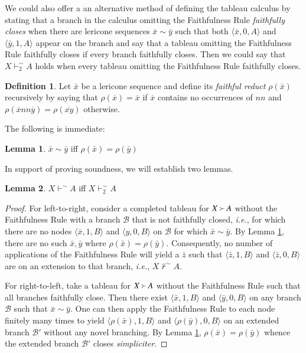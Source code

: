 \documentclass{amsart}
\theoremstyle{definition}
\newtheorem{lemma}{Lemma}
\newtheorem{mdef}{Definition}
\begin{document}
We could also offer a an alternative method of defining the tableau calculus by stating that a branch in the calculus omitting the Faithfulness Rule \emph{faithfully closes} when there are lericone sequences $\bar{x}\sim\bar{y}$ such that both $\langle\bar{x},0,A\rangle$ and $\langle\bar{y},1,A\rangle$ appear on the branch and say that a tableau omitting the Faithfulness Rule faithfully closes if every branch faithfully closes. Then we could say that $X\vdash^{\sim}_{2}A$ holds when every tableau omitting the Faithfulness Rule faithfully closes.

\begin{mdef}
    Let $\bar{x}$ be a lericone sequence and define its \emph{faithful reduct} $\rho(\bar{x})$ recursively by saying that $\rho(\overline{x})=\overline{x}$ if $\overline{x}$ contains no occurrences of $nn$ and $\rho(\overline{x}nn\overline{y})=\rho(\overline{xy})$ otherwise.
\end{mdef}

\noindent The following is immediate:

\begin{lemma}\label{lemma:reduct-identity}
    $\bar{x}\sim\bar{y}$ iff $\rho(\bar{x})=\rho(\bar{y})$
\end{lemma}

\noindent In support of proving soundness, we will establish two lemmas.

\begin{lemma}\label{lemma:equivalence-faithful}
    $X\vdash^{\sim}A$ iff $X\vdash^{\sim}_{2}A$
\end{lemma}

\begin{proof}
    For left-to-right, consider a completed tableau for $X\Yright A$ without the Faithfulness Rule with a branch $\mathcal{B}$ that is not faithfully closed, \emph{i.e.}, for which there are no nodes $\langle\bar{x},1,B\rangle$ and $\langle{y},0,B\rangle$ on $\mathcal{B}$ for which $\bar{x}\sim\bar{y}$. By Lemma \ref{lemma:reduct-identity}, there are no such $\bar{x},\bar{y}$ where $\rho(\bar{x})=\rho(\bar{y})$. Consequently, no number of applications of the Faithfulness Rule will yield a $\bar{z}$ such that $\langle\bar{z},1,B\rangle$ and $\langle\bar{z},0,B\rangle$ are on an extension to that branch, \emph{i.e.}, $X\nvdash^{\sim}A$.

    For right-to-left, take a tableau for $X\Yright A$ without the Faithfulness Rule such that all branches faithfully close. Then there exist $\langle\bar{x},1,B\rangle$ and $\langle\bar{y},0,B\rangle$ on any branch $\mathcal{B}$ such that $\bar{x}\sim\bar{y}$. One can then apply the Faithfulness Rule to each node finitely many times to yield $\langle\rho(\bar{x}),1,B\rangle$ and $\langle\rho(\bar{y}),0,B\rangle$ on an extended branch $\mathcal{B}'$ without any novel branching. By Lemma \ref{lemma:reduct-identity}, $\rho(\bar{x})=\rho(\bar{y})$ whence the extended branch $\mathcal{B}'$ closes \emph{simpliciter}.
\end{proof}
\end{document}
